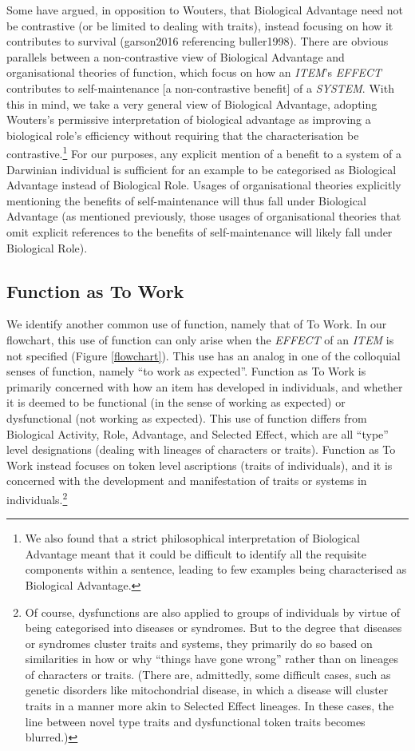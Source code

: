 \documentclass{article}
\begin{document}
Some have argued, in opposition to Wouters, that Biological Advantage need not be contrastive (or be limited to dealing with traits), instead focusing on how it contributes to survival (garson2016 referencing buller1998).
There are obvious parallels between a non-contrastive view of Biological Advantage and organisational theories of function, which focus on how an \emph{ITEM}'s \emph{EFFECT} contributes to self-maintenance [a non-contrastive benefit] of a \emph{SYSTEM}.
With this in mind, we take a very general view of Biological Advantage, adopting Wouters's permissive interpretation of biological advantage as improving a biological role's efficiency without requiring that the characterisation be contrastive.\footnote{We also found that a strict philosophical interpretation of Biological Advantage meant that it could be difficult to identify all the requisite components within a sentence, leading to few examples being characterised as Biological Advantage.}
For our purposes, any explicit mention of a benefit to a system of a Darwinian individual is sufficient for an example to be categorised as Biological Advantage instead of Biological Role.
Usages of organisational theories explicitly mentioning the benefits of self-maintenance will thus fall under Biological Advantage (as mentioned previously, those usages of organisational theories that omit explicit references to the benefits of self-maintenance will likely fall under Biological Role).

\subsection{Function as To Work}
\label{sec:funct-as-perf}

We identify another common use of function, namely that of To Work.
In our flowchart, this use of function can only arise when the \emph{EFFECT} of an \emph{ITEM} is not specified (Figure \ref{flowchart}).
This use has an analog in one of the colloquial senses of function, namely ``to work as expected''.
Function as To Work is primarily concerned with how an item has developed in individuals, and whether it is deemed to be functional (in the sense of working as expected) or dysfunctional (not working as expected).
This use of function differs from Biological Activity, Role, Advantage, and Selected Effect, which are all ``type'' level designations (dealing with lineages of characters or traits).
Function as To Work instead focuses on token level ascriptions (traits of individuals), and it is concerned with the development and manifestation of traits or systems in individuals.\footnote{Of course, dysfunctions are also applied to groups of individuals by virtue of being categorised into diseases or syndromes.
But to the degree that diseases or syndromes cluster traits and systems, they primarily do so based on similarities in how or why ``things have gone wrong'' rather than on lineages of characters or traits.
(There are, admittedly, some difficult cases, such as genetic disorders like mitochondrial disease, in which a disease will cluster traits in a manner more akin to Selected Effect lineages. In these cases, the line between novel type traits and dysfunctional token traits becomes blurred.)}
\end{document}
